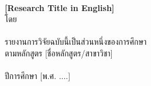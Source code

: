 \thispagestyle{empty}
\begin{center}
\vspace*{2.5cm}
{}\\[6pt]
{\Large\bfseries [Research Title in English]}\\[3.5cm]

{\bodysize โดย}\\[1.2cm]
{\hOneSize [ชื่อ-นามสกุลผู้วิจัย]}\\[4.5cm]

{\bodysize รายงานการวิจัยฉบับนี้เป็นส่วนหนึ่งของการศึกษา}\\
{\bodysize ตามหลักสูตร [ชื่อหลักสูตร/สาขาวิชา]}\\
{}\\
{\bodysize ปีการศึกษา [พ.ศ. ....]}
\end{center}
